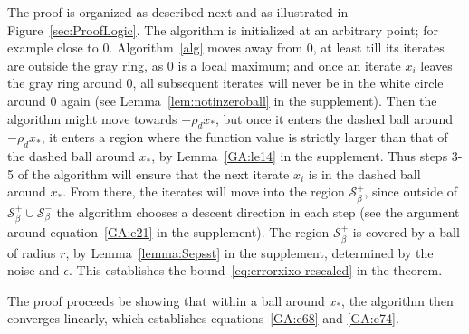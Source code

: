 \documentclass[11pt]{article}
\newcommand{\xo}{x_\ast}
\begin{document}
The proof is organized as described next and as illustrated in Figure~\ref{sec:ProofLogic}. 
The algorithm is initialized at an arbitrary point; for example close to $0$. Algorithm~\ref{alg} moves away from $0$, at least till its iterates are outside the gray ring, as $0$ is a local maximum; and once an iterate $x_i$ leaves the gray ring around $0$, all subsequent iterates will never be in the white circle around $0$ again (see Lemma~\ref{lem:notinzeroball} in the supplement).
Then the algorithm might move towards $-\rho_d x_\ast$, but once it enters the dashed ball around $-\rho_d x_\ast$, it enters a region where the function value is strictly larger than that of the dashed ball around $x_\ast$, by Lemma~\ref{GA:le14} in the supplement.
Thus steps 3-5 of the algorithm will ensure that the next iterate $x_i$ is in the dashed ball around $x_\ast$.
From there, the iterates will move into the region $\mathcal S_\beta^+$, since outside of $\mathcal S_\beta^+ \cup \mathcal S_\beta^-$ the algorithm chooses a descent direction in each step (see the argument around equation~\eqref{GA:e21} in the supplement).
The region $\mathcal S_\beta^+$ is covered by a ball of radius $r$, by Lemma~\ref{lemma:Sepsst} in the supplement, determined by the noise and $\epsilon$.
This establishes the bound~\eqref{eq:errorxixo-rescaled} in the theorem. 

The proof proceeds be showing that within a ball around $\xo$, the algorithm then converges linearly, which establishes equations~\eqref{GA:e68} and \eqref{GA:e74}.
\end{document}
